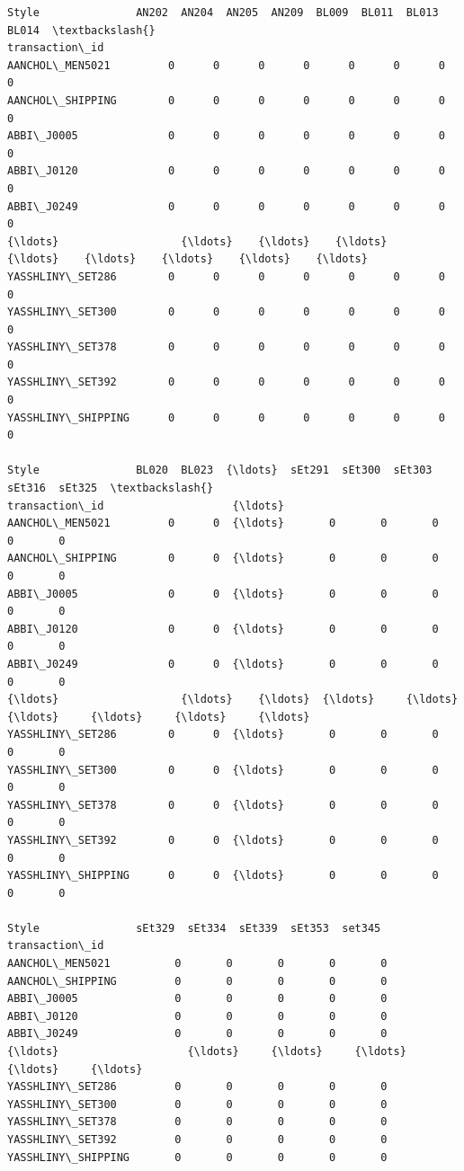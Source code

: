\documentclass[11pt]{article}
\makeatletter
\newcommand{\boxspacing}{\kern\kvtcb@left@rule\kern\kvtcb@boxsep}
\newcommand{\prompt}[4]{
        {\ttfamily\llap{{\color{#2}[#3]:\hspace{3pt}#4}}\vspace{-\baselineskip}}
    }
\makeatother
\begin{document}
            \begin{tcolorbox}[breakable, size=fbox, boxrule=.5pt, pad at break*=1mm, opacityfill=0]
\prompt{Out}{outcolor}{50}{\boxspacing}
\begin{Verbatim}[commandchars=\\\{\}]
Style               AN202  AN204  AN205  AN209  BL009  BL011  BL013  BL014  \textbackslash{}
transaction\_id
AANCHOL\_MEN5021         0      0      0      0      0      0      0      0
AANCHOL\_SHIPPING        0      0      0      0      0      0      0      0
ABBI\_J0005              0      0      0      0      0      0      0      0
ABBI\_J0120              0      0      0      0      0      0      0      0
ABBI\_J0249              0      0      0      0      0      0      0      0
{\ldots}                   {\ldots}    {\ldots}    {\ldots}    {\ldots}    {\ldots}    {\ldots}    {\ldots}    {\ldots}
YASSHLINY\_SET286        0      0      0      0      0      0      0      0
YASSHLINY\_SET300        0      0      0      0      0      0      0      0
YASSHLINY\_SET378        0      0      0      0      0      0      0      0
YASSHLINY\_SET392        0      0      0      0      0      0      0      0
YASSHLINY\_SHIPPING      0      0      0      0      0      0      0      0

Style               BL020  BL023  {\ldots}  sEt291  sEt300  sEt303  sEt316  sEt325  \textbackslash{}
transaction\_id                    {\ldots}
AANCHOL\_MEN5021         0      0  {\ldots}       0       0       0       0       0
AANCHOL\_SHIPPING        0      0  {\ldots}       0       0       0       0       0
ABBI\_J0005              0      0  {\ldots}       0       0       0       0       0
ABBI\_J0120              0      0  {\ldots}       0       0       0       0       0
ABBI\_J0249              0      0  {\ldots}       0       0       0       0       0
{\ldots}                   {\ldots}    {\ldots}  {\ldots}     {\ldots}     {\ldots}     {\ldots}     {\ldots}     {\ldots}
YASSHLINY\_SET286        0      0  {\ldots}       0       0       0       0       0
YASSHLINY\_SET300        0      0  {\ldots}       0       0       0       0       0
YASSHLINY\_SET378        0      0  {\ldots}       0       0       0       0       0
YASSHLINY\_SET392        0      0  {\ldots}       0       0       0       0       0
YASSHLINY\_SHIPPING      0      0  {\ldots}       0       0       0       0       0

Style               sEt329  sEt334  sEt339  sEt353  set345
transaction\_id
AANCHOL\_MEN5021          0       0       0       0       0
AANCHOL\_SHIPPING         0       0       0       0       0
ABBI\_J0005               0       0       0       0       0
ABBI\_J0120               0       0       0       0       0
ABBI\_J0249               0       0       0       0       0
{\ldots}                    {\ldots}     {\ldots}     {\ldots}     {\ldots}     {\ldots}
YASSHLINY\_SET286         0       0       0       0       0
YASSHLINY\_SET300         0       0       0       0       0
YASSHLINY\_SET378         0       0       0       0       0
YASSHLINY\_SET392         0       0       0       0       0
YASSHLINY\_SHIPPING       0       0       0       0       0


\end{Verbatim}
\end{tcolorbox}
\end{document}
